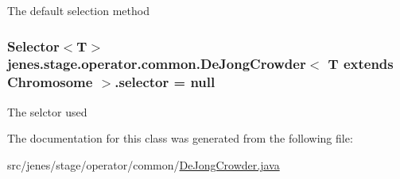 The default selection method \hypertarget{classjenes_1_1stage_1_1operator_1_1common_1_1_de_jong_crowder_3_01_t_01extends_01_chromosome_01_4_a6486b0225d345afd81b86dd04772d5ba}{
\subsubsection[{selector}]{\setlength{\rightskip}{0pt plus 5cm}Selector$<$T$>$ jenes.\-stage.\-operator.\-common.\-De\-Jong\-Crowder$<$ T extends Chromosome $>$.selector = null\hspace{0.3cm}{\ttfamily [protected]}}}\label{classjenes_1_1stage_1_1operator_1_1common_1_1_de_jong_crowder_3_01_t_01extends_01_chromosome_01_4_a6486b0225d345afd81b86dd04772d5ba}
The selctor used 

The documentation for this class was generated from the following file\-:\begin{DoxyCompactItemize}
\item 
src/jenes/stage/operator/common/\hyperlink{_de_jong_crowder_8java}{De\-Jong\-Crowder.\-java}\end{DoxyCompactItemize}
